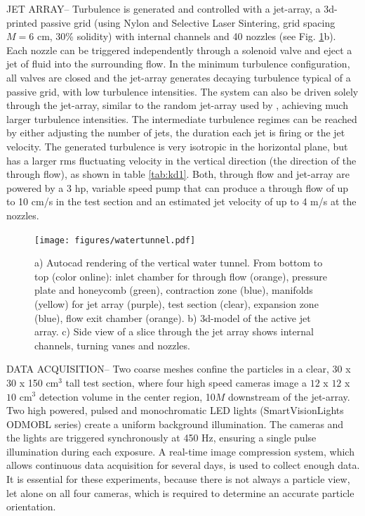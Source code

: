 \documentclass[]{jfm}
\begin{document}
JET ARRAY-- Turbulence is generated and controlled with a jet-array, a 3d-printed passive grid (using Nylon and Selective Laser Sintering, grid spacing $M=6$ cm, 30\% solidity) with internal channels and 40 nozzles (see Fig. \ref{Fig:watertunnel}b).  Each nozzle can be triggered independently through a solenoid valve and eject a jet of fluid into the surrounding flow.  In the minimum turbulence configuration, all valves are closed and the jet-array generates decaying turbulence typical of a passive grid, with low turbulence intensities.  The system can also be driven solely through the jet-array, similar to the random jet-array used by \cite{2008Variano}, achieving much larger turbulence intensities.  The intermediate turbulence regimes can be reached by either adjusting the number of jets, the duration each jet is firing or the jet velocity.  The generated turbulence is very isotropic in the horizontal plane, but has a larger rms fluctuating velocity in the vertical direction (the direction of the through flow), as shown in table \ref{tab:kd1}.  Both, through flow and jet-array are powered by a 3 hp, variable speed pump that can produce a through flow of up to 10 cm/s in the test section and an estimated jet velocity of up to 4 m/s at the nozzles. 
\begin{figure}
\centering
  \texttt{[image: figures/watertunnel.pdf]}
  \caption{a) Autocad rendering of the vertical water tunnel. From bottom to top (color online): inlet chamber for through flow (orange), pressure plate and honeycomb (green), contraction zone (blue), manifolds (yellow) for jet array (purple), test section (clear), expansion zone (blue), flow exit chamber (orange). b) 3d-model of the active jet array. c) Side view of a slice through the jet array shows internal channels, turning vanes and nozzles.}
	\label{Fig:watertunnel}
\end{figure}

DATA ACQUISITION-- Two coarse meshes confine the particles in a clear, 30 x 30 x 150 cm$^3$ tall test section, where four high speed cameras image a $12$ x $12$ x $10$ cm$^3$ detection volume in the center region, 10$M$ downstream of the jet-array.  Two high powered, pulsed and monochromatic LED lights (SmartVisionLights ODMOBL series) create a uniform background illumination.  The cameras and the lights are triggered synchronously at 450 Hz, ensuring a single pulse illumination during each exposure.  A real-time image compression system, which allows continuous data acquisition for several days, is used to collect enough data.  It is essential for these experiments, because there is not always a particle view, let alone on all four cameras, which is required to determine an accurate particle orientation.
\end{document}
